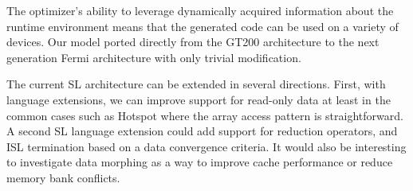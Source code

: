 \documentclass[preprint,nocopyrightspace]{styles/sigplanconf}
\begin{document}
The optimizer's ability to leverage
dynamically acquired information about the runtime environment
means that the generated code can be used on a variety of devices.
Our model ported directly from the GT200 architecture to
the next generation Fermi architecture with only trivial
modification.

The current SL architecture can be extended in several directions.  First, with
language extensions, we can improve support for read-only data at least in the
common cases such as Hotspot where the array access pattern is
straightforward.  A second SL language extension could add support for 
reduction operators, and ISL termination based on a data convergence criteria.  
It would also be interesting to investigate data morphing as a way to improve cache
performance or reduce memory bank conflicts.  




\addtolength{\itemsep}{-0.2\baselineskip}
\balance


\end{document}
